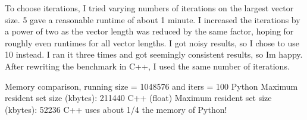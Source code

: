 To choose iterations, I tried varying numbers of iterations on the largest vector size. 5 gave a reasonable runtime of about 1 minute. I increased the iterations by a power of two as the vector length was reduced by the same factor, hoping for roughly even runtimes for all vector lengths. I got noisy results, so I chose to use 10 instead. I ran it three times and got seemingly consistent results, so I\textquotesingle{}m happy. After rewriting the benchmark in C++, I used the same number of iterations.

Memory comparison, running size = 1048576 and iters = 100 Python Maximum resident set size (kbytes)\+: 211440 C++ (float) Maximum resident set size (kbytes)\+: 52236 C++ uses about 1/4 the memory of Python! 